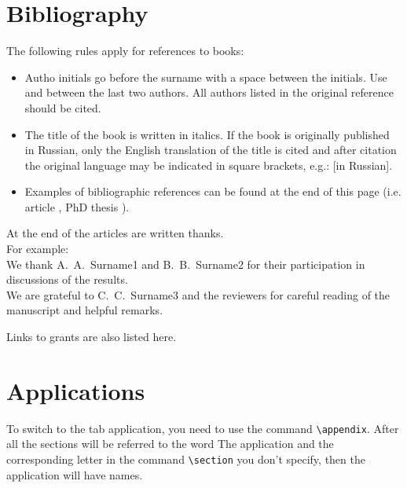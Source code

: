 \documentclass[
11pt,%
tightenlines,%
twoside,%
onecolumn,%
nofloats,%
nobibnotes,%
nofootinbib,%
superscriptaddress,%
noshowpacs,%
centertags]%
{revtex4}
\begin{document}
\section{Bibliography}
The following rules apply for references to books:

\begin{itemize}
  \item Autho initials go before the surname with a space between the initials. Use and between the last two authors. All authors listed in the original reference should be cited.
  \item The title of the book is written in italics. If the book is originally published in Russian, only the English translation of the title is cited and after citation the original language may be indicated in square brackets, e.g.: [in Russian].
  \item Examples of bibliographic references can be found at the end of this page (i.e. article \cite{ex}, PhD thesis \cite{maguire-76}).
\end{itemize}


\begin{acknowledgments}
At the end of the articles are written thanks.\\
For example:\\
We thank A.~A.~Surname1 and B.~B.~Surname2 for their participation in discussions of the results.\\
We are grateful to C.~C.~Surname3 and the reviewers for careful reading of the manuscript and helpful remarks.

Links to grants are also listed here.
\end{acknowledgments}


\appendix

\section{Applications}

To switch to the tab application, you need to use the command
\verb+\appendix+. After all the sections will be referred to the word
The application and the corresponding letter in the command \verb+\section+
you don't specify, then the application will have
names.

\section{}
\end{document}
